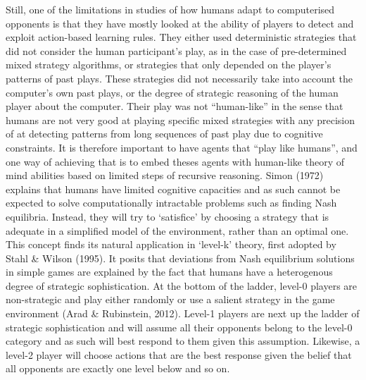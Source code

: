 \documentclass[man,floatsintext]{apa6}
\begin{document}
Still, one of the limitations in studies of how humans adapt to computerised opponents is that they have mostly looked at the ability of players to detect and exploit action-based learning rules. They either used deterministic strategies that did not consider the human participant's play, as in the case of pre-determined mixed strategy algorithms, or strategies that only depended on the player's patterns of past plays. These strategies did not necessarily take into account the computer's own past plays, or the degree of strategic reasoning of the human player about the computer. Their play was not ``human-like'' in the sense that humans are not very good at playing specific mixed strategies with any precision of at detecting patterns from long sequences of past play due to cognitive constraints. It is therefore important to have agents that ``play like humans'', and one way of achieving that is to embed theses agents with human-like theory of mind abilities based on limited steps of recursive reasoning. Simon (1972) explains that humans have limited cognitive capacities and as such cannot be expected to solve computationally intractable problems such as finding Nash equilibria. Instead, they will try to `satisfice' by choosing a strategy that is adequate in a simplified model of the environment, rather than an optimal one. This concept finds its natural application in `level-k' theory, first adopted by Stahl \& Wilson (1995). It posits that deviations from Nash equilibrium solutions in simple games are explained by the fact that humans have a heterogenous degree of strategic sophistication. At the bottom of the ladder, level-0 players are non-strategic and play either randomly or use a salient strategy in the game environment (Arad \& Rubinstein, 2012). Level-1 players are next up the ladder of strategic sophistication and will assume all their opponents belong to the level-0 category and as such will best respond to them given this assumption. Likewise, a level-2 player will choose actions that are the best response given the belief that all opponents are exactly one level below and so on.
\end{document}
